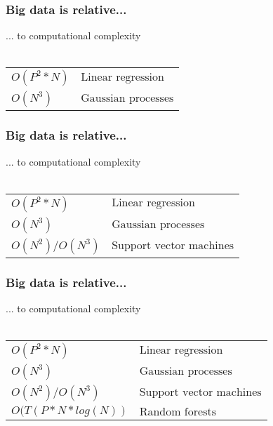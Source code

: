 \documentclass{beamer}
\begin{document}
\begin{frame}
	\frametitle{Big data is relative...}
	\begin{center}
		... to computational complexity\\~\\
		\begin{tabular}{ l l }
			$O(P^2 * N) $ & $ \text{Linear regression}$\\
			$O(N^3) $ & $ \text{Gaussian processes}$\\
		\end{tabular}
	\end{center}
\end{frame}

\begin{frame}
	\frametitle{Big data is relative...}
	\begin{center}
		... to computational complexity\\~\\
		\begin{tabular}{ l l }
			$O(P^2 * N) $ & $ \text{Linear regression}$\\
			$O(N^3) $ & $ \text{Gaussian processes}$\\
			$O(N^2) / O(N^3) $ & $ \text{Support vector machines}$\\
		\end{tabular}
	\end{center}
\end{frame}

\begin{frame}
	\frametitle{Big data is relative...}
	\begin{center}
		... to computational complexity\\~\\
		\begin{tabular}{ l l }
			$O(P^2 * N) $ & $ \text{Linear regression}$\\
			$O(N^3) $ & $ \text{Gaussian processes}$\\
			$O(N^2) / O(N^3) $ & $ \text{Support vector machines}$\\
			$O(T(P * N * log(N)) $ & $ \text{Random forests}$\\
		\end{tabular}
	\end{center}
\end{frame}
\end{document}
